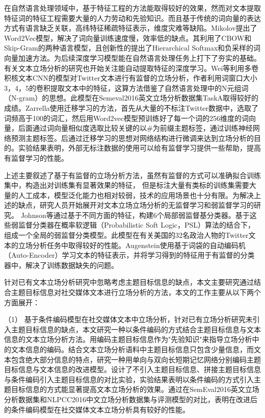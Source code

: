 在自然语言处理领域中，基于特征工程的方法能取得较好的效果，然而对文本提取特征词的特征工程需要大量的人力劳动和先验知识。而且基于传统的词向量的表达方式有语言缺乏关联，高纬特征稀疏特征表示，维度灾难等缺陷。Mikolov提出了Word2Vec模型，解决了词向量训练速度慢，效率低的缺点。其利用了CBOW和Skip-Gram的两种语言模型，且创新性的提出了Hierarchical Softmax和负采样的词向量加速方法。为后续深度学习模型能在自然语言处理任务上打下了夯实的基础。有关文本立场分析的研究也开始关注能自动提取特征的深度学习。Wei等利用多卷积核文本CNN的模型对Twitter文本进行有监督的立场分析，作者利用词窗口大小3，4，5的卷积提取文本中的特征，这算方法借鉴了自然语言处理中的N元组词（N-gram）的思想。此模型在Semeval2016英文立场分析数据集TaskA取得较好的成绩。Zarrella使用迁移学习的方法，首先从大量的不标注Twitter数据中，选取了词频高于100的词汇，然后用Word2vec模型预训练好了每一个词的256维度的词向量，后面通过词向量相似度选取比较关键的以\#为前缀主题标签，通过训练神经网络预测主题标签。后通过迁移学习的思想对网络结构进行微调来达到立场分析的目的。实验结果表明，外部无标注数据的使用可以给有监督学习提供一些帮助，提高有监督学习的性能。

上述主要叙述了基于有监督的立场分析方法，虽然有监督的方式可以准确拟合训练集中，构造出对训练集有显著效果的特征， 但是标注大量有类标的训练集需要大量的人工成本，模型泛化能力也相对较弱，技术的应用场景也十分有限。为解决上述的缺点，研究人员开始展开对文本立场立场分析的无监督学习和弱监督学习的研究。 Johnson等通过基于不同方面的特征，构建6个局部弱监督基分类器。基于这些弱监督分类器在概率软逻辑（Probabilistic Soft Logic，PSL）算法的结合下，组成一个全局的弱监督分类模型。此模型在有关美国的32名政治人物的Twitter文本的立场分析任务中取得较好的性能。Augenstein使用基于词袋的自动编码机（Auto-Encoder）学习文本的特征表示，并将学习得到的特征用于有监督的分类器中，解决了训练数据缺失的问题。





针对已有文本立场分析研究中忽略考虑主题目标信息的缺点，本文主要研究通过结合主题目标信息对社交媒体文本进行立场分析的方法，本文的工作主要从以下两个方面展开：

（1） 基于条件编码模型在社交媒体文本中立场分析，针对已有立场分析研究未引入主题目标信息的缺点，本文研究一种以条件编码的方式结合主题目标信息与文本信息的文本立场分析方法。用编码主题目标信息作为"先验知识"来指导立场分析中的文本信息的编码。结合文本立场分析语料中主题目标信息只包含少量信息，而文本包含绝大部分信息的特点，研究一种用单向与双向长短期记忆网络分别编码主题目标信息与文本信息的改进模型。设计了不引入主题目标信息、拼接主题目标信息与条件编码引入主题目标信息的对比实验，实验结果表明以条件编码的方式引入主题目标信息的方式能显著提高文本立场分析的效果。通过在SemEval2016英文立场分析数据集和NLPCC2016中文立场分析数据集与评测模型的对比，表明在改进后的条件编码模型在社交媒体文本立场分析具有较好的性能。


